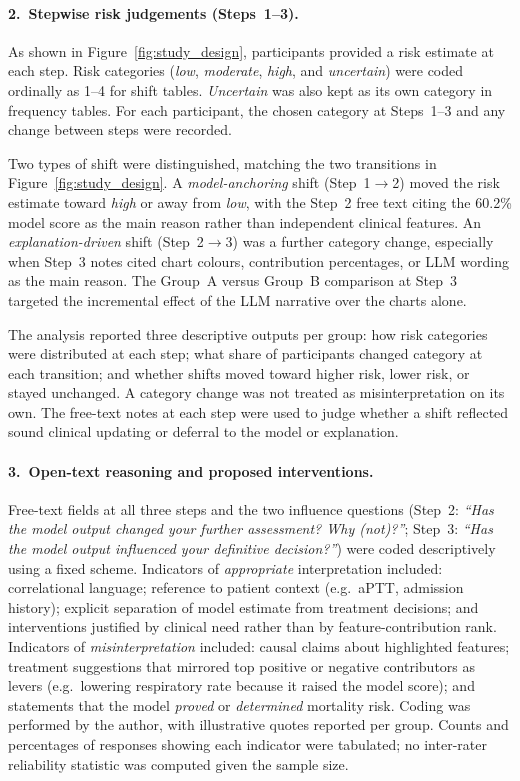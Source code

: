 \documentclass[12pt, a4paper]{article}
\begin{document}
\paragraph*{2.\ Stepwise risk judgements (Steps~1--3).}
As shown in Figure~\ref{fig:study_design}, participants provided a risk
estimate at each step. Risk categories (\emph{low}, \emph{moderate},
\emph{high}, and \emph{uncertain}) were coded ordinally as 1--4 for
shift tables. \emph{Uncertain} was also kept as its own category in
frequency tables. For each participant, the chosen category at
Steps~1--3 and any change between steps were recorded.

Two types of shift were distinguished, matching the two transitions in
Figure~\ref{fig:study_design}. A \emph{model-anchoring} shift
(Step~1$\to$2) moved the risk estimate toward \emph{high} or away from
\emph{low}, with the Step~2 free text citing the 60.2\% model score as
the main reason rather than independent clinical features. An
\emph{explanation-driven} shift (Step~2$\to$3) was a further category
change, especially when Step~3 notes cited chart colours, contribution
percentages, or LLM wording as the main reason. The Group~A versus
Group~B comparison at Step~3 targeted the incremental effect of the
LLM narrative over the charts alone.

The analysis reported three descriptive outputs per group: how risk
categories were distributed at each step; what share of participants
changed category at each transition; and whether shifts moved toward
higher risk, lower risk, or stayed unchanged. A category change was not
treated as misinterpretation on its own. The free-text notes at each
step were used to judge whether a shift reflected sound clinical
updating or deferral to the model or explanation.

\paragraph*{3.\ Open-text reasoning and proposed interventions.}
Free-text fields at all three steps and the two influence questions
(Step~2: \emph{``Has the model output changed your further assessment?
Why (not)?''}; Step~3: \emph{``Has the model output influenced your
definitive decision?''}) were coded descriptively using a fixed scheme.
Indicators of \emph{appropriate} interpretation included: correlational
language; reference to patient context (e.g.\ aPTT, admission history);
explicit separation of model estimate from treatment decisions; and
interventions justified by clinical need rather than by
feature-contribution rank. Indicators of \emph{misinterpretation}
included: causal claims about highlighted features; treatment
suggestions that mirrored top positive or negative contributors as
levers (e.g.\ lowering respiratory rate because it raised the model
score); and statements that the model \emph{proved} or
\emph{determined} mortality risk. Coding was performed by the author,
with illustrative quotes reported per group. Counts and percentages of
responses showing each indicator were tabulated; no inter-rater
reliability statistic was computed given the sample size.
\end{document}
